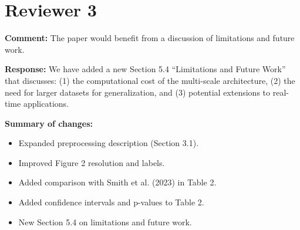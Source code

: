 \documentclass[11pt, a4paper]{article}
\newcommand{\reviewer}[1]{\section*{Reviewer #1}}
\newcommand{\comment}[1]{\noindent\textbf{Comment:} #1\par}
\newcommand{\response}[1]{\noindent\textbf{Response:} #1\par\vspace{1em}}
\begin{document}
\reviewer{3}

\comment{The paper would benefit from a discussion
of limitations and future work.}

\response{We have added a new Section 5.4 ``Limitations
and Future Work'' that discusses: (1) the computational
cost of the multi-scale architecture, (2) the need for
larger datasets for generalization, and (3) potential
extensions to real-time applications.}

\vspace{1em}
\noindent\textbf{Summary of changes:}
\begin{itemize}
\item Expanded preprocessing description (Section 3.1).
\item Improved Figure 2 resolution and labels.
\item Added comparison with Smith et al. (2023) in Table 2.
\item Added confidence intervals and p-values to Table 2.
\item New Section 5.4 on limitations and future work.
\end{itemize}
\end{document}
